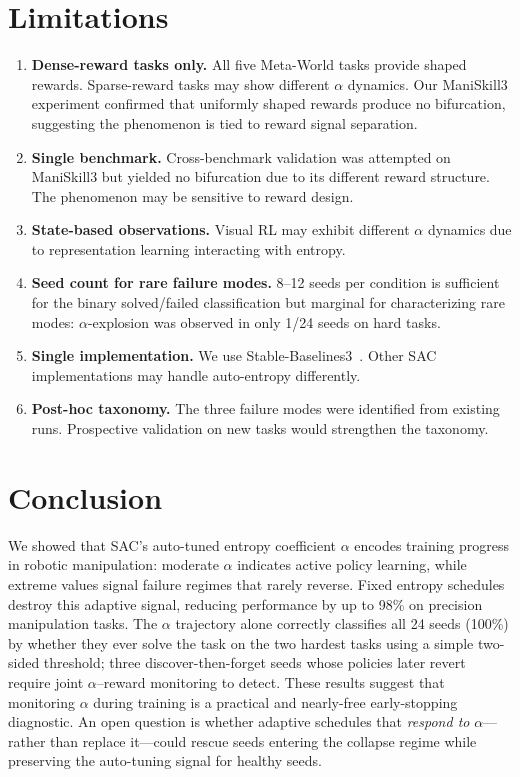\documentclass[twocolumn]{article}
\begin{document}
\section{Limitations}
\label{sec:limitations}

\begin{enumerate}
  \item \textbf{Dense-reward tasks only.} All five Meta-World tasks provide
  shaped rewards. Sparse-reward tasks may show different $\alpha$ dynamics.
  Our ManiSkill3 experiment confirmed that uniformly shaped rewards produce
  no bifurcation, suggesting the phenomenon is tied to reward signal separation.
  \item \textbf{Single benchmark.} Cross-benchmark validation was attempted on
  ManiSkill3 but yielded no bifurcation due to its different reward structure.
  The phenomenon may be sensitive to reward design.
  \item \textbf{State-based observations.} Visual RL may exhibit different
  $\alpha$ dynamics due to representation learning interacting with entropy.
  \item \textbf{Seed count for rare failure modes.} 8--12 seeds per condition
  is sufficient for the binary solved/failed classification but marginal for
  characterizing rare modes: $\alpha$-explosion was observed in only 1/24
  seeds on hard tasks.
  \item \textbf{Single implementation.} We use Stable-Baselines3~\citep{raffin2021}.
  Other SAC implementations may handle auto-entropy differently.
  \item \textbf{Post-hoc taxonomy.} The three failure modes were identified from
  existing runs. Prospective validation on new tasks would strengthen the
  taxonomy.
\end{enumerate}


\section{Conclusion}
\label{sec:conclusion}

We showed that SAC's auto-tuned entropy coefficient $\alpha$ encodes training
progress in robotic manipulation: moderate $\alpha$ indicates active policy
learning, while extreme values signal failure regimes that rarely reverse.
Fixed entropy schedules destroy this adaptive signal, reducing performance by
up to 98\% on precision manipulation tasks. The $\alpha$ trajectory alone
correctly classifies all 24 seeds (100\%) by whether they ever solve the task
on the two hardest tasks using a simple two-sided threshold; three
discover-then-forget seeds whose policies later revert require joint $\alpha$--reward
monitoring to detect. These results
suggest that monitoring $\alpha$ during
training is a practical and nearly-free early-stopping diagnostic. An open
question is whether adaptive schedules that \emph{respond to} $\alpha$---rather
than replace it---could rescue seeds entering the collapse regime while
preserving the auto-tuning signal for healthy seeds.
\end{document}
